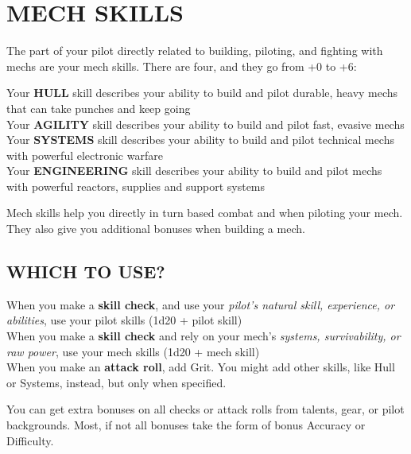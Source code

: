\section{MECH SKILLS}

The part of your pilot directly related to building, piloting, and fighting with mechs are your mech
skills. There are four, and they go from +0 to +6:

Your \textbf{HULL} skill describes your ability to build and pilot durable, heavy mechs that can take
punches and keep going \\
Your \textbf{AGILITY} skill describes your ability to build and pilot fast,
evasive mechs \\
Your \textbf{SYSTEMS} skill describes your ability to build and pilot technical mechs with powerful
electronic warfare \\
Your \textbf{ENGINEERING} skill describes your ability to build and pilot mechs with powerful reactors,
supplies and support systems

Mech skills help you directly in turn based combat and when piloting your mech. They also give
you additional bonuses when building a mech.

\subsection*{WHICH TO USE?}

When you make a \textbf{skill check}, and use your \textit{pilot’s natural skill, experience, or abilities}, use your
pilot skills (1d20 + pilot skill) \\
When you make a \textbf{skill check} and rely on your mech’s \textit{systems, survivability, or raw power}, use
your mech skills (1d20 + mech skill) \\
When you make an \textbf{attack roll}, add Grit. You might add other skills, like Hull or Systems, instead,
but only when specified.

You can get extra bonuses on all checks or attack rolls from talents, gear, or pilot backgrounds.
Most, if not all bonuses take the form of bonus Accuracy or Difficulty.